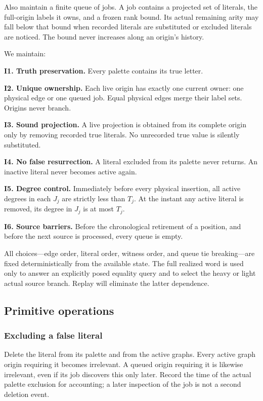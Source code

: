 Also maintain a finite queue of jobs. A job contains a projected set of literals, the full-origin labels it owns, and a frozen rank bound. Its actual remaining arity may fall below that bound when recorded literals are substituted or excluded literals are noticed. The bound never increases along an origin's history.

We maintain:

\textbf{I1. Truth preservation.} Every palette contains its true letter.

\textbf{I2. Unique ownership.} Each live origin has exactly one current owner: one physical edge or one queued job. Equal physical edges merge their label sets. Origins never branch.

\textbf{I3. Sound projection.} A live projection is obtained from its complete origin only by removing recorded true literals. No unrecorded true value is silently substituted.

\textbf{I4. No false resurrection.} A literal excluded from its palette never returns. An inactive literal never becomes active again.

\textbf{I5. Degree control.} Immediately before every physical insertion, all active degrees in each \(J_j\) are strictly less than \(T_j\). At the instant any active literal is removed, its degree in \(J_j\) is at most \(T_j\).

\textbf{I6. Source barriers.} Before the chronological retirement of a position, and before the next source is processed, every queue is empty.

All choices---edge order, literal order, witness order, and queue tie breaking---are fixed deterministically from the available state. The full realized word is used only to answer an explicitly posed equality query and to select the heavy or light actual source branch. Replay will eliminate the latter dependence.

\subsection{Primitive operations}\label{primitive-operations}

\subsubsection{Excluding a false literal}\label{excluding-a-false-literal}

Delete the literal from its palette and from the active graphs. Every active graph origin requiring it becomes irrelevant. A queued origin requiring it is likewise irrelevant, even if its job discovers this only later. Record the time of the actual palette exclusion for accounting; a later inspection of the job is not a second deletion event.

